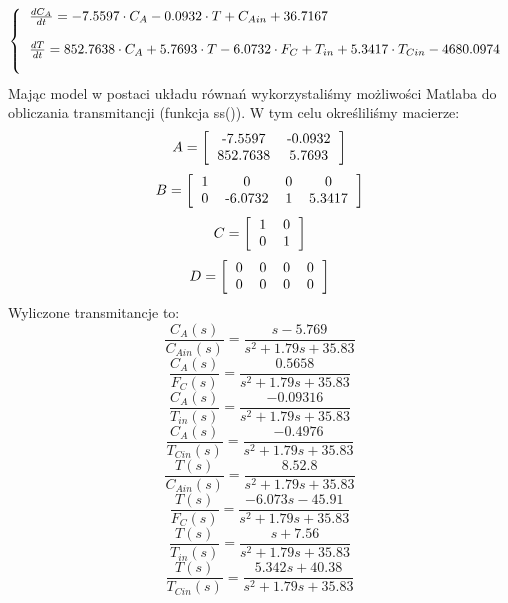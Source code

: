 \begin{equation}
\left\{
\begin{tabular}{l}
$\frac{dC_A}{dt} = -7.5597\cdot C_A-0.0932\cdot T+C_{Ain} + 36.7167$\\\\
$\frac{dT}{dt} = 852.7638\cdot C_A + 5.7693\cdot T -6.0732\cdot F_C + T_{in} + 5.3417\cdot T_{Cin} - 4680.0974$\\\\
\end{tabular}
\right.
\end{equation}
Mając model w postaci układu równań wykorzystaliśmy możliwości Matlaba do obliczania transmitancji (funkcja ss()). W tym celu określiliśmy macierze:
\begin{equation}
	A=\left[
	\begin{tabular}{c c}
	-7.5597&-0.0932\\852.7638&5.7693
	\end{tabular}
	\right]
\end{equation}
\begin{equation}
B=\left[
\begin{tabular}{c c c c}
1&0&0&0\\0&-6.0732&1&5.3417
\end{tabular}
\right]
\end{equation}
\begin{equation}
C=\left[
\begin{tabular}{c c}
1&0\\0&1
\end{tabular}
\right]
\end{equation}
\begin{equation}
D=\left[
\begin{tabular}{c c c c}
0&0&0&0\\0&0&0&0
\end{tabular}
\right]
\end{equation}
Wyliczone transmitancje to:
\begin{equation}
	\frac{C_A(s)}{C_{Ain}(s)} = \frac{s-5.769}{s^2+1.79s+35.83}
\end{equation}
\begin{equation}
\frac{C_A(s)}{F_C(s)} = \frac{0.5658}{s^2+1.79s+35.83}
\end{equation}
\begin{equation}
\frac{C_A(s)}{T_{in}(s)} = \frac{-0.09316}{s^2+1.79s+35.83}
\end{equation}
\begin{equation}
\frac{C_A(s)}{T_{Cin}(s)} = \frac{-0.4976}{s^2+1.79s+35.83}
\end{equation}
\begin{equation}
\frac{T(s)}{C_{Ain}(s)} = \frac{8.52.8}{s^2+1.79s+35.83}
\end{equation}
\begin{equation}
\frac{T(s)}{F_C(s)} = \frac{-6.073s-45.91}{s^2+1.79s+35.83}
\end{equation}
\begin{equation}
\frac{T(s)}{T_{in}(s)} = \frac{s + 7.56}{s^2+1.79s+35.83}
\end{equation}
\begin{equation}
\frac{T(s)}{T_{Cin}(s)} = \frac{5.342 s + 40.38}{s^2+1.79s+35.83}
\end{equation}